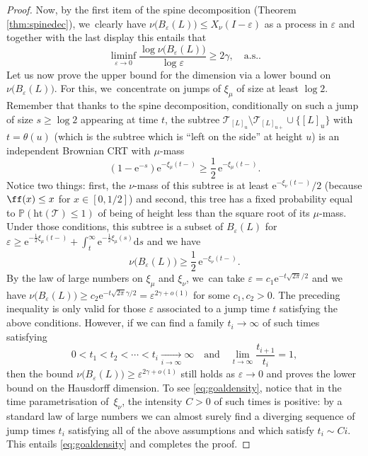 \documentclass[11pt]{article}
\let\dH\gamma
\newcommand{\T}{\mathcal{T}}\let\CRT\T\let\tbr\T
\newcommand{\h}{\mathrm{ht}}
\theoremstyle{definition}
\begin{document}
\begin{proof}
Now, by the first item of the spine decomposition (Theorem \ref{thm:spinedec}), we~clearly have $\nu\big(B_{ \varepsilon }(L)\big) \leq X_\nu(I - \varepsilon)$ as a process in $ \varepsilon$ and together with the last display this entails that
\[
\liminf_{ \varepsilon \to 0} \frac{\log \nu \big(B_\varepsilon(L)\big) }{\log \varepsilon} \geq 2 \dH, \quad \text{a.s.}.
\]
Let us now prove the upper bound for the dimension via a lower bound on $\nu \big(B_\varepsilon(L)\big)$. For this, we~concentrate on jumps of $\xi_\mu$ of size at least $\log 2$. Remember that thanks to the spine decomposition, conditionally on such a jump of size $s\geq \log 2$ appearing at time $t$, the subtree $\T_{[L]_{u}}\setminus \T_{[L]_{u+}} \cup \{[L]_{u}\}$ with $t=\theta(u)$ (which is the subtree which is ``left on the side'' at height $u$) is an independent Brownian CRT with $\mu$-mass
\[
(1- \mathrm{e}^{-s}) \mathrm{e}^{- \xi_\mu(t-)} \geq \frac{1}{2}\, \mathrm{e}^{- \xi_\mu(t-)}.
\]
Notice two things: first, the $\nu$-mass of this subtree is at least $ \mathrm{e}^{- \xi_\nu(t-)}/2$ (because $\ff(x) \leq x$ for $x \in [0,1/2]$) and second, this tree has a fixed probability equal to $ \mathbb{P}(\h(\mathcal{T}) \leq 1)$ of being of height less than the square root of its $\mu$-mass. Under those conditions, this subtree is a subset of $B_{ \varepsilon}(L)$ for $\varepsilon \geq \mathrm{e}^{-\frac12 \xi_\mu(t-)} + \int_{t}^\infty \mathrm{e}^{-\frac12 \xi_\mu(s)} \mathrm{d}s$ and we have
\begin{equation} \label{eq:lowerbound12}\nu \big(B_{ \varepsilon}(L)\big) \geq \frac12\, \mathrm{e}^{- \xi_\nu(t-)}.
\end{equation} By the law of large numbers on $\xi_\mu$ and $\xi_\nu$, we~can take $\varepsilon = c_1 \mathrm{e}^{- t \sqrt{2\pi}/2}$ and we have $\nu \big(B_{ \varepsilon}(L)\big) \geq c_2 \mathrm{e}^{- t \sqrt{2\pi} \gamma/2} = \varepsilon^{2\gamma + o(1)}$ for some $c_1,c_2>0$. The preceding inequality is only valid for those $ \varepsilon$ associated to a jump time $t$ satisfying the above conditions. However, if we can find a family $t_i \to \infty$ of such times satisfying
\begin{equation} \label{eq:goaldensity} 0 < t_1 < t_2 < \cdots < t_i \xrightarrow[\textstyle i \to \infty]{} \infty \quad \text{and} \quad\lim_{t \to \infty} \frac{t_{i+1}}{t_i} =1,
\end{equation}
then the bound $\nu \big(B_{ \varepsilon}(L)\big) \geq \varepsilon^{2\gamma + o(1)}$ still holds as $ \varepsilon \to 0$ and proves the lower bound on the Hausdorff dimension. To see \eqref{eq:goaldensity}, notice that in the time parametrisation of~$\xi_\nu$, the intensity $C>0$ of such times is positive: by a standard law of large numbers we can almost surely find a diverging sequence of jump times $t_i$ satisfying all of the above assumptions and which satisfy $t_i \sim C i$. This entails \eqref{eq:goaldensity} and completes the proof.
\end{proof}
\end{document}
